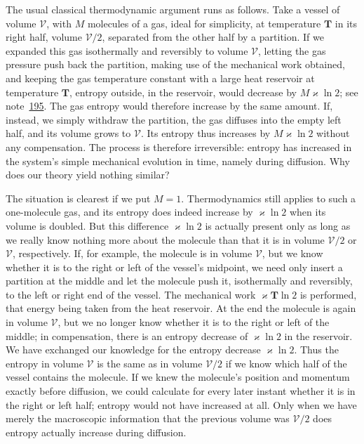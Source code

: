 \documentclass[fontsize=13pt,twoside,openany,headings=normal,parskip=false,bookmarkpackage=false,DIV=calc]{scrbook}
\begin{document}
The usual classical thermodynamic argument runs as follows. Take a vessel of volume $\mathcal V$, with $M$ molecules of a gas, ideal for simplicity, at temperature $\mathbf T$ in its right half, volume $\mathcal V/2$, separated from the other half by a partition. If we expanded this gas isothermally and reversibly to volume $\mathcal V$, letting the gas pressure push back the partition, making use of the mechanical work obtained, and keeping the gas temperature constant with a large heat reservoir at temperature $\mathbf T$, entropy outside, in the reservoir, would decrease by $M\varkappa\ln2$; see note~\hyperlink{note-195}{195}. The gas entropy would therefore increase by the same amount. If, instead, we simply withdraw the partition, the gas diffuses into the empty left half, and its volume grows to $\mathcal V$. Its entropy thus increases by $M\varkappa\ln2$ without any compensation. The process is therefore irreversible: entropy has increased in the system's simple mechanical evolution in time, namely during diffusion. Why does our theory yield nothing similar?

The situation is clearest if we put $M=1$. Thermodynamics still applies to such a one-molecule gas, and its entropy does indeed increase by $\varkappa\ln2$ when its volume is doubled. But this difference $\varkappa\ln2$ is actually present only as long as we really know nothing more about the molecule than that it is
\hypertarget{origpage-213}{}%
in volume $\mathcal V/2$ or $\mathcal V$, respectively. If, for example, the molecule is in volume $\mathcal V$, but we know whether it is to the right or left of the vessel's midpoint, we need only insert a partition at the middle and let the molecule push it, isothermally and reversibly, to the left or right end of the vessel. The mechanical work $\varkappa\mathbf T\ln2$ is performed, that energy being taken from the heat reservoir. At the end the molecule is again in volume $\mathcal V$, but we no longer know whether it is to the right or left of the middle; in compensation, there is an entropy decrease of $\varkappa\ln2$ in the reservoir. We have exchanged our knowledge for the entropy decrease $\varkappa\ln2$. Thus the entropy in volume $\mathcal V$ is the same as in volume $\mathcal V/2$ if we know which half of the vessel contains the molecule. If we knew the molecule's position and momentum exactly before diffusion, we could calculate for every later instant whether it is in the right or left half; entropy would not have increased at all. Only when we have merely the macroscopic information that the previous volume was $\mathcal V/2$ does entropy actually increase during diffusion.
\end{document}

